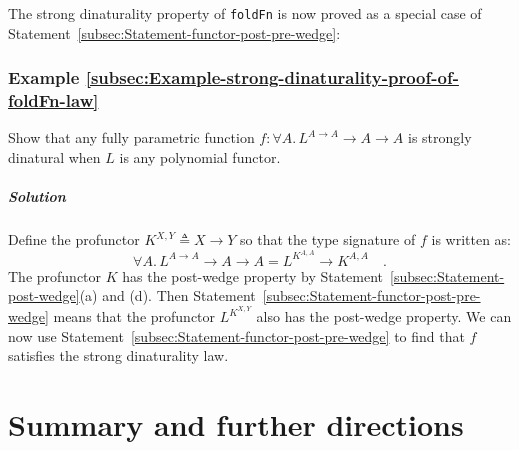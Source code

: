 The strong dinaturality property of \lstinline!foldFn! is now proved
as a special case of Statement~\ref{subsec:Statement-functor-post-pre-wedge}:

\subsubsection{Example \label{subsec:Example-strong-dinaturality-proof-of-foldFn-law}\ref{subsec:Example-strong-dinaturality-proof-of-foldFn-law}}

Show that any fully parametric function $f:\forall A.\,L^{A\rightarrow A}\rightarrow A\rightarrow A$
is strongly dinatural when $L$ is any polynomial functor.

\subparagraph{Solution}

Define the profunctor $K^{X,Y}\triangleq X\rightarrow Y$ so that
the type signature of $f$ is written as:
\[
\forall A.\,L^{A\rightarrow A}\rightarrow A\rightarrow A=L^{K^{A,A}}\rightarrow K^{A,A}\quad.
\]
The profunctor $K$ has the post-wedge property by Statement~\ref{subsec:Statement-post-wedge}(a)
and (d). Then Statement~\ref{subsec:Statement-functor-post-pre-wedge}
means that the profunctor $L^{K^{X,Y}}$ also has the post-wedge property.
We can now use Statement~\ref{subsec:Statement-functor-post-pre-wedge}
to find that $f$ satisfies the strong dinaturality law. 

\section{Summary and further directions}

